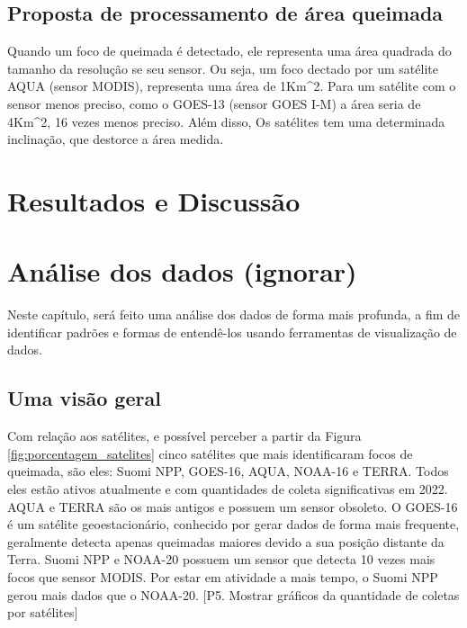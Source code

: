 \documentclass[cic,tc]{iiufrgs}
\begin{document}
\section{Proposta de processamento de área queimada}

Quando um foco de queimada é detectado, ele representa uma área quadrada do 
tamanho da resolução se seu sensor. Ou seja, um foco dectado por um satélite AQUA 
(sensor MODIS), representa uma área de 1Km^2. Para um satélite com o sensor menos 
preciso, como o GOES-13 (sensor GOES I-M) a área seria de 4Km^2, 16 vezes menos 
preciso. Além disso, Os satélites tem uma determinada inclinação, que destorce 
a área medida. 




\chapter{Resultados e Discussão}





\chapter{Análise dos dados (ignorar)}

Neste capítulo, será feito uma análise dos dados de forma mais profunda, a 
fim de identificar padrões e formas de entendê-los usando ferramentas de 
visualização de dados.

\section{Uma visão geral}



Com relação aos satélites, e possível perceber a partir da Figura
\ref{fig:porcentagem_satelites} cinco satélites que mais identificaram  
focos de queimada, são eles: Suomi NPP, GOES-16, AQUA, NOAA-16 e TERRA. 
Todos eles estão 
ativos atualmente e com quantidades de coleta significativas em 2022. AQUA e TERRA 
são os mais antigos e possuem um sensor obsoleto. O GOES-16 é um satélite
geoestacionário, conhecido por gerar dados de forma mais frequente, geralmente 
detecta apenas queimadas maiores devido a sua posição distante da Terra. Suomi NPP e
NOAA-20 possuem um sensor que detecta 10 vezes mais focos que sensor MODIS. Por 
estar em atividade a mais tempo, o Suomi NPP gerou mais dados que o NOAA-20.
[P5. Mostrar gráficos da quantidade de coletas por satélites] \par
\end{document}
